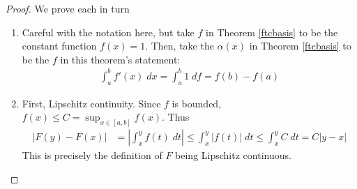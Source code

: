 \documentclass[12pt]{article}
\numberwithin{equation}{section} %
\theoremstyle{plain}
\theoremstyle{definition}
\theoremstyle{remark}
\begin{document}
\begin{proof}
We prove each in turn
\begin{enumerate}[label=\Roman*.]
  \item
    Careful with the notation here, but take $f$ in Theorem
    \ref{ftcbasis} to be the constant function $f(x) =1$. Then, take the
    $\alpha(x)$ in Theorem \ref{ftcbasis} to be the $f$ in this
    theorem's statement:
    \begin{align*}
      \int^b_a f'(x) \;dx = \int^b_a 1 \;df = f(b) - f(a)
    \end{align*}
  \item
    First, Lipschitz continuity. Since $f$ is bounded,
    $f(x) \leq C = \sup_{x\in[a,b]} f(x)$.
    Thus
    \begin{align*}
        |F(y) - F(x)| &= \left\lvert \int^y_x f(t)\;dt \right\rvert
            \leq \int^y_x |f(t)|\;dt
        \leq \int^y_x C\;dt = C|y-x|
    \end{align*}
    This is precisely the definition of $F$ being Lipschitz continuous.


\end{enumerate}
\end{proof}
\end{document}
